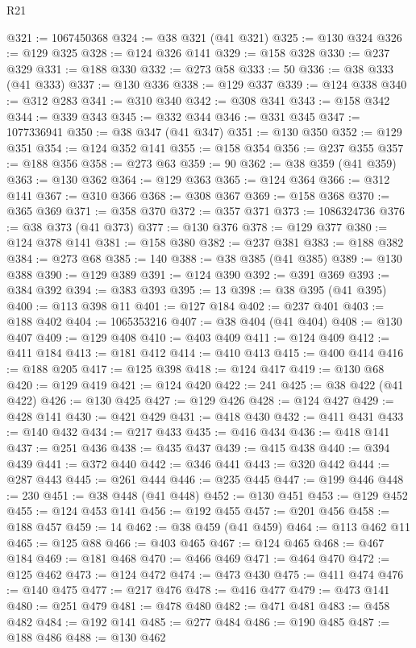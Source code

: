 \begin{lexlean}{R21}
\begin{coremodule}
@321 := 1067450368
@324 := @38 @321 (@41 @321)
@325 := @130 @324
@326 := @129 @325
@328 := @124 @326 @141
@329 := @158 @328
@330 := @237 @329
@331 := @188 @330
@332 := @273 @58
@333 := 50
@336 := @38 @333 (@41 @333)
@337 := @130 @336
@338 := @129 @337
@339 := @124 @338
@340 := @312 @283
@341 := @310 @340
@342 := @308 @341
@343 := @158 @342
@344 := @339 @343
@345 := @332 @344
@346 := @331 @345
@347 := 1077336941
@350 := @38 @347 (@41 @347)
@351 := @130 @350
@352 := @129 @351
@354 := @124 @352 @141
@355 := @158 @354
@356 := @237 @355
@357 := @188 @356
@358 := @273 @63
@359 := 90
@362 := @38 @359 (@41 @359)
@363 := @130 @362
@364 := @129 @363
@365 := @124 @364
@366 := @312 @141
@367 := @310 @366
@368 := @308 @367
@369 := @158 @368
@370 := @365 @369
@371 := @358 @370
@372 := @357 @371
@373 := 1086324736
@376 := @38 @373 (@41 @373)
@377 := @130 @376
@378 := @129 @377
@380 := @124 @378 @141
@381 := @158 @380
@382 := @237 @381
@383 := @188 @382
@384 := @273 @68
@385 := 140
@388 := @38 @385 (@41 @385)
@389 := @130 @388
@390 := @129 @389
@391 := @124 @390
@392 := @391 @369
@393 := @384 @392
@394 := @383 @393
@395 := 13
@398 := @38 @395 (@41 @395)
@400 := @113 @398 @11
@401 := @127 @184
@402 := @237 @401
@403 := @188 @402
@404 := 1065353216
@407 := @38 @404 (@41 @404)
@408 := @130 @407
@409 := @129 @408
@410 := @403 @409
@411 := @124 @409
@412 := @411 @184
@413 := @181 @412
@414 := @410 @413
@415 := @400 @414
@416 := @188 @205
@417 := @125 @398
@418 := @124 @417
@419 := @130 @68
@420 := @129 @419
@421 := @124 @420
@422 := 241
@425 := @38 @422 (@41 @422)
@426 := @130 @425
@427 := @129 @426
@428 := @124 @427
@429 := @428 @141
@430 := @421 @429
@431 := @418 @430
@432 := @411 @431
@433 := @140 @432
@434 := @217 @433
@435 := @416 @434
@436 := @418 @141
@437 := @251 @436
@438 := @435 @437
@439 := @415 @438
@440 := @394 @439
@441 := @372 @440
@442 := @346 @441
@443 := @320 @442
@444 := @287 @443
@445 := @261 @444
@446 := @235 @445
@447 := @199 @446
@448 := 230
@451 := @38 @448 (@41 @448)
@452 := @130 @451
@453 := @129 @452
@455 := @124 @453 @141
@456 := @192 @455
@457 := @201 @456
@458 := @188 @457
@459 := 14
@462 := @38 @459 (@41 @459)
@464 := @113 @462 @11
@465 := @125 @88
@466 := @403 @465
@467 := @124 @465
@468 := @467 @184
@469 := @181 @468
@470 := @466 @469
@471 := @464 @470
@472 := @125 @462
@473 := @124 @472
@474 := @473 @430
@475 := @411 @474
@476 := @140 @475
@477 := @217 @476
@478 := @416 @477
@479 := @473 @141
@480 := @251 @479
@481 := @478 @480
@482 := @471 @481
@483 := @458 @482
@484 := @192 @141
@485 := @277 @484
@486 := @190 @485
@487 := @188 @486
@488 := @130 @462

\end{coremodule}
\end{lexlean}
